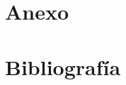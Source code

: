 \documentclass{article}
\def\versionanexo{anexo-codigo}
\begin{document}
\maketitle
\tableofcontents
\newpage

\begin{multicols*}{2}

















\end{multicols*}

\newpage
\appendix

\section{Anexo}



\section{Bibliografía}
\end{document}
